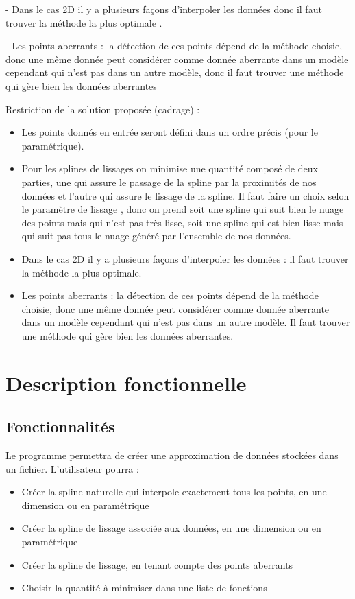 \documentclass[a4paper,12pt]{article}
\begin{document}
-          Dans le cas 2D il y a plusieurs façons d’interpoler les données donc il faut trouver la méthode la plus optimale .
 
-          Les points aberrants : la détection de ces points dépend de la méthode choisie, donc une même donnée peut considérer comme donnée aberrante dans un modèle cependant qui n’est pas dans un autre modèle, donc il faut trouver une méthode qui gère bien les données aberrantes   


Restriction de la solution proposée (cadrage) :
\begin{itemize}
\item Les points donnés en entrée seront défini dans un ordre précis (pour le paramétrique).
\item Pour les splines de lissages on minimise une quantité composé de deux parties, une qui assure le passage de la spline par la proximités de nos données et l’autre qui assure le lissage de la spline. Il faut faire un choix selon le paramètre de lissage , donc on prend soit une spline qui suit bien le nuage des points mais qui n’est pas très lisse, soit une spline qui est bien lisse mais qui suit pas tous le nuage généré par l’ensemble de nos données.
\item Dans le cas 2D il y a plusieurs façons d’interpoler les données : il faut trouver la méthode la plus optimale.
\item Les points aberrants : la détection de ces points dépend de la méthode choisie, donc une même donnée peut considérer comme donnée aberrante dans un modèle cependant qui n’est pas dans un autre modèle. Il faut trouver une méthode qui gère bien les données aberrantes.
\end{itemize}

\section{Description fonctionnelle}

\subsection{Fonctionnalités}
\label{Fonctions}

Le programme permettra de créer une approximation de données stockées dans un fichier. L'utilisateur pourra :
\begin{itemize}
\item Créer la spline naturelle qui interpole exactement tous les points, en une dimension ou en paramétrique
\item Créer la spline de lissage associée aux données, en une dimension ou en paramétrique
\item Créer la spline de lissage, en tenant compte des points aberrants
\item Choisir la quantité à minimiser dans une liste de fonctions
\end{itemize}
\end{document}
